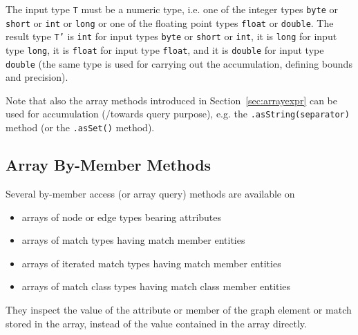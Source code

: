 The input type \texttt{T} must be a numeric type, i.e. one of the integer types \texttt{byte} or \texttt{short} or \texttt{int} or \texttt{long} or one of the floating point types \texttt{float} or \texttt{double}. 
The result type \texttt{T'} is \texttt{int} for input types \texttt{byte} or \texttt{short} or \texttt{int}, it is \texttt{long} for input type \texttt{long}, it is \texttt{float} for input type \texttt{float}, and it is \texttt{double} for input type \texttt{double} (the same type is used for carrying out the accumulation, defining bounds and precision).

Note that also the array methods introduced in Section~\ref{sec:arrayexpr} can be used for accumulation (/towards query purpose), e.g. the \texttt{.asString(separator)} method (or the \texttt{.asSet()} method).

\subsection{Array By-Member Methods} 

Several by-member access (or array query) methods are available on 

\begin{itemize}
	\item arrays of node or edge types bearing attributes
	\item arrays of match types having match member entities
	\item arrays of iterated match types having match member entities
	\item arrays of match class types having match class member entities
\end{itemize}

They inspect the value of the attribute or member of the graph element or match stored in the array, instead of the value contained in the array directly.

